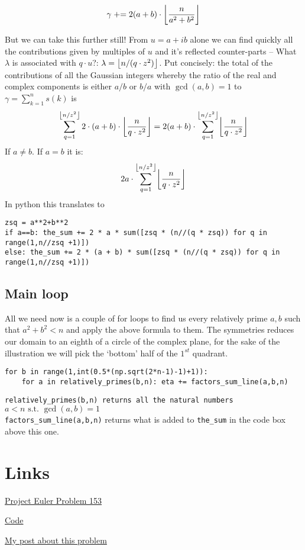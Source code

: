 \documentclass[11pt]{article}
\newcommand{\st}{\text{ s.t. }}
\DeclarePairedDelimiter\floor{\lfloor}{\rfloor}
\begin{document}
$$
\gamma \mspace{5mu} + \mspace{-5mu}= 2 (a+b) \cdot \floor*{\frac{n}{a^2+b^2}}
$$

But we can take this further still! From $u = a+ib$ alone we can find quickly all the contributions given by multiples of $u$ and it's reflected counter-parts -- What $\lambda$ is associated with $q\cdot u$?: $\lambda = \floor*{n/(q\cdot z^2)}$. Put concisely: the total of the contributions of all the Gaussian integers whereby the ratio of the real and complex components is either $a/b$ or $b/a$ with $\gcd(a,b)=1$ to $\gamma = \sum_{k=1}^{n} s(k)$ is
$$
\sum_{q=1}^{\floor*{n/z^2}} 2\cdot (a+b)\cdot \floor*{\frac{n}{q\cdot z^2}} = 
2 (a+b)\cdot \sum_{q=1}^{\floor*{n/z^2}} \floor*{\frac{n}{q\cdot z^2}}
$$
If $a\neq b$. If $a=b$ it is:
$$
2 a\cdot \sum_{q=1}^{\floor*{n/z^2}} \floor*{\frac{n}{q\cdot z^2}}
$$
In python this translates to
\lstset{frame=btlr}
\begin{lstlisting}
zsq = a**2+b**2
if a==b: the_sum += 2 * a * sum([zsq * (n//(q * zsq)) for q in range(1,n//zsq +1)])
else: the_sum += 2 * (a + b) * sum([zsq * (n//(q * zsq)) for q in range(1,n//zsq +1)])
\end{lstlisting}

\subsection{Main loop}

All we need now is a couple of for loops to find us every relatively prime $a,b$ such that $a^2+b^2 < n$ and apply the above formula to them. The symmetries reduces our domain to an eighth of a circle of the complex plane, for the sake of the illustration we will pick the `bottom' half of the $1^{st}$ quadrant.



\begin{lstlisting}
for b in range(1,int(0.5*(np.sqrt(2*n-1)-1)+1)):
    for a in relatively_primes(b,n): eta += factors_sum_line(a,b,n)
\end{lstlisting}
\texttt{relatively\_primes(b,n) returns all the natural numbers $a<n\st \gcd(a,b)=1$}\\
\texttt{factors\_sum\_line(a,b,n)} returns what is added to \texttt{the\_sum} in the code box above this one.







\section{Links}

\begin{itmemize}
\item \href{https://projecteuler.net/problem=153}{Project Euler Problem 153}
\item \href{https://github.com/dcxSt/project-euler/blob/master/problem\%20153\%20gaussian\%20integers/problem153.py}{Code}
\item \href{}{My post about this problem}

\end{itmemize}
\end{document}
